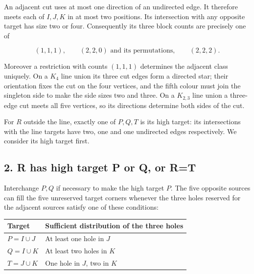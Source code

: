 \documentclass[
  10pt,
]{article}
\begin{document}
An adjacent cut uses at most one direction of an undirected edge. It
therefore meets each of \(I,J,K\) in at most two positions. Its
intersection with any opposite target has size two or four. Consequently
its three block counts are precisely one of

\[
(1,1,1),\qquad (2,2,0)\text{ and its permutations},\qquad (2,2,2).
\]

Moreover a restriction with counts \((1,1,1)\) determines the adjacent
class uniquely. On a \(K_4\) line union its three cut edges form a
directed star; their orientation fixes the cut on the four vertices, and
the fifth colour must join the singleton side to make the side sizes two
and three. On a \(K_{2,3}\) line union a three-edge cut meets all five
vertices, so its directions determine both sides of the cut.

For \(R\) outside the line, exactly one of \(P,Q,T\) is its high target:
its intersections with the line targets have two, one and one undirected
edges respectively. We consider its high target first.

\hypertarget{r-has-high-target-p-or-q-or-rt}{%
\subsection*{2. R has high target P or Q, or
R=T}\label{r-has-high-target-p-or-q-or-rt}}

Interchange \(P,Q\) if necessary to make the high target \(P\). The five
opposite sources can fill the five unreserved target corners whenever
the three holes reserved for the adjacent sources satisfy one of these
conditions:

\begin{longtable}[]{@{}ll@{}}
\toprule\noalign{}
Target & Sufficient distribution of the three holes \\
\midrule\noalign{}
\endhead
\bottomrule\noalign{}
\endlastfoot
\(P=I\cup J\) & At least one hole in \(J\) \\
\(Q=I\cup K\) & At least two holes in \(K\) \\
\(T=J\cup K\) & One hole in \(J\), two in \(K\) \\
\end{longtable}
\end{document}
